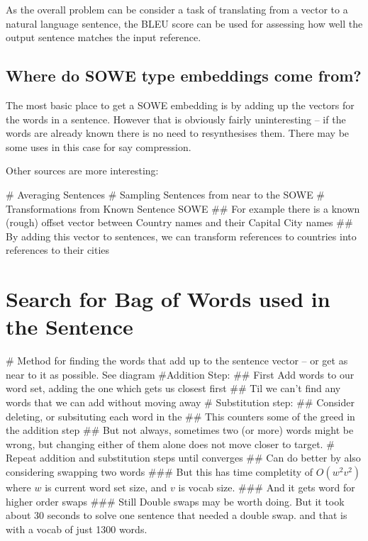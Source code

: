 \documentclass[]{scrartcl}
\numberwithin{equation}{section}
\numberwithin{figure}{section}
\theoremstyle{plain}
\theoremstyle{definition}
\begin{document}
As the overall problem can be consider a task of translating from a vector to a natural language sentence, the BLEU  score \parencite{Papineni2002} can be used for assessing how well the output sentence matches the input reference.




\subsection{Where do SOWE type embeddings come from?}
The most basic place to get a SOWE embedding is by adding up the vectors for the words in a sentence.
However that is obviously fairly uninteresting -- if the words are already known there is no need to resynthesises them. There may be some uses in this case for say compression.

Other sources are more interesting:

\begin{easylist}[itemize]
	# Averaging Sentences
	# Sampling Sentences from near to the SOWE
	# Transformations from Known Sentence SOWE
	## For example there is a known (rough) offset vector between Country names and their Capital City names
	## By adding this vector to sentences, we can transform references to countries into references to their cities
\end{easylist}


\section{Search for Bag of Words used in the Sentence}



\begin{easylist}[itemize]
	# Method for finding the words that add up to the sentence vector -- or get as near to it as possible. See diagram
	#Addition Step:
	## First Add words to our word set, adding the one which gets us closest first
	## Til we can't find any words that we can add without moving away
	# Substitution step:
	## Consider deleting, or subsituting each word in the
	## This counters some of the greed in the addition step
	## But not always, sometimes two (or more) words might be wrong, but changing either of them alone does not move closer to target.
	# Repeat addition and substitution steps until converges
	## Can do better by also considering swapping two words
	### But this has time completity of $O(w^2 v^2)$ where $w$ is current word set size, and $v$ is vocab size.
	### And it gets word for higher order swaps
	### Still Double swaps may be worth doing. But it took about 30 seconds to solve one sentence that needed a double swap. and that is with a vocab of just 1300 words.
\end{easylist}
\end{document}

